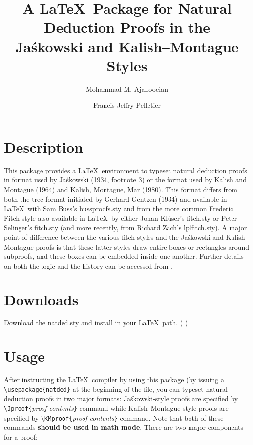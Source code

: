 \documentclass{article}
\title{A \LaTeX\, Package for Natural Deduction Proofs in the \\ Ja\'skowski and Kalish--Montague Styles}
\author{Mohammad M. Ajallooeian \and Francis Jeffry Pelletier}
\date{}
\newcommand{\Jas}{Ja\'skowski }
\newcommand{\KM}{Kalish-Montague }
\begin{document}
\maketitle

\section{Description}

This package provides a \LaTeX\, environment to typeset natural deduction proofs in format used by Ja\'skowski (1934, footnote 3) or the format used by Kalish and Montague (1964) and Kalish, Montague, Mar (1980).  This format differs from both the tree format initiated by Gerhard Gentzen (1934) and available in \LaTeX\, with Sam Buss's bussproofs.sty and from the more common Frederic Fitch style also available in \LaTeX\, by either Johan Kl\"user's fitch.sty or Peter Selinger's fitch.sty (and more recently, from Richard Zach's lplfitch.sty).  A major point of difference between the various fitch-styles and the \Jas and \KM proofs is that these latter styles  draw entire boxes or rectangles around subproofs, and these boxes can be embedded inside one another.  Further details on both the logic and the history can be accessed from {\color{red}{this paper -- link to JasKMnatded.pdf}}.

\section{Downloads}

Download the natded.sty and install in your \LaTeX\ path. ( {\color{red}{Download link for this sty-file here}})

\section{Usage}

After instructing the \LaTeX\, compiler by using this package (by issuing a \verb+\usepackage{natded}+ at the beginning of the file, you can typeset natural deduction proofs in two major formats: Ja\'skowski-style proofs are specified by \verb+\Jproof{+\emph{proof contents}\verb+}+ command while Kalish--Montague-style proofs are specified by \verb+\KMproof{+\emph{proof contents}\verb+}+ command. Note that both of these commands \textbf{should be used in math mode}. There are two major components for a proof: 

\medskip
\end{document}
